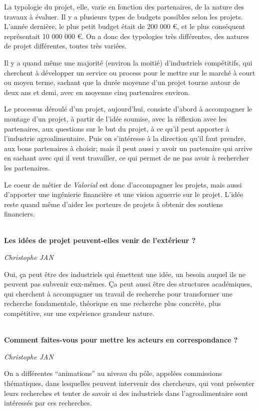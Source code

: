 \documentclass[a4paper,12pt]{report}
\begin{document}
	La typologie du projet, elle, varie en fonction des partenaires, de la nature des travaux à évaluer. Il y a plusieurs types de budgets possibles selon les projets. L’année dernière, le plus petit budget était de 200 000 €, et le plus conséquent représentait 10 000 000 €. On a donc des typologies très différentes, des natures de projet différentes, toutes très variées.

	Il y a quand même une majorité (environ la moitié) d’industriels compétitifs, qui cherchent à développer un service ou process pour le mettre sur le marché à court ou moyen terme, sachant que la durée moyenne d’un projet tourne autour de deux ans et demi, avec en moyenne cinq partenaires environ.

	Le processus déroulé d’un projet, aujourd’hui, consiste d’abord à accompagner le montage d’un projet, à partir de l’idée soumise, avec la réflexion avec les partenaires, aux questions sur le but du projet, à ce qu’il peut apporter à l’industrie agroalimentaire. Puis on s’intéresse à la direction qu’il faut prendre, aux bons partenaires à choisir; mais il peut aussi y avoir un partenaire qui arrive en sachant avec qui il veut travailler, ce qui permet de ne pas avoir à rechercher les partenaires.

	Le coeur de métier de \textit{Valorial} est donc d’accompagner les projets, mais aussi d’apporter une ingénierie financière et une vision aguerrie sur le projet. L’idée reste quand même d’aider les porteurs de projets à obtenir des soutiens financiers.

	\textbf{\\Les idées de projet peuvent-elles venir de l’extérieur ?}
    
	\emph{Christophe JAN}

	Oui, ça peut être des industriels qui émettent une idée, un besoin auquel ils ne peuvent pas subvenir eux-mêmes. Ça peut aussi être des structures académiques, qui cherchent à accompagner un travail de recherche pour transformer une recherche fondamentale, théorique en une recherche plus concrète, plus compétitive, sur une expérience grandeur nature.

	\textbf{\\Comment faites-vous pour mettre les acteurs en correspondance ?}

	\emph{Christophe JAN}
    
    On a différentes “animations” au niveau du pôle, appelées commissions thématiques, dans lesquelles peuvent intervenir des chercheurs, qui vont présenter leurs recherches et tenter de savoir si des industriels dans l’agroalimentaire sont intéressés par ces recherches.
\end{document}

